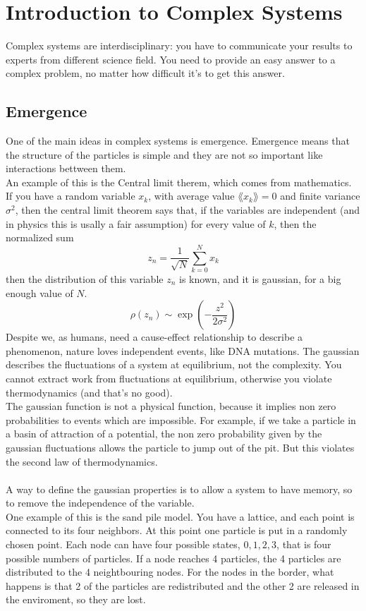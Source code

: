 \chapter{Introduction to Complex Systems}
Complex systems are interdisciplinary: you have to communicate your results to experts from different science field.
You need to provide an easy answer to a complex problem, no matter how difficult it's to get this answer.

\section{Emergence}
One of the main ideas in complex systems is emergence. Emergence means that the structure of the particles is simple and they are not so important like interactions bettween them. \\
An example of this is the Central limit therem, which comes from mathematics. \\
If you have a random variable $x_k$, with average value $\lang x_k \rang = 0$ and finite variance $\sigma^2$, then the central limit theorem says that, if the variables are independent (and in physics this is usally a fair assumption) for every value of $k$, then the normalized sum 
$$
	z_n = \frac{1}{\sqrt{N}}\sum_{k=0}^N x_k
$$
then the distribution of this variable $z_n$ is known, and it is gaussian, for a big enough value of $N$.
$$
	\rho(z_n) \sim \exp\left(-\frac{z^2}{2\sigma^2}\right)
$$
Despite we, as humans, need a cause-effect relationship to describe a phenomenon, nature loves independent events, like DNA mutations.
The gaussian describes the fluctuations of a system at equilibrium, not the complexity. You cannot extract work from fluctuations at equilibrium, otherwise you violate thermodynamics (and that's no good). \\
The gaussian function is not a physical function, because it implies non zero probabilities to events which are impossible. For example, if we take a particle in a basin of attraction of a potential, the non zero probability given by the gaussian fluctuations allows the particle to jump out of the pit. But this violates the second law of thermodynamics. \\ \\
A way to define the gaussian properties is to allow a system to have memory, so to remove the independence of the variable. \\
One example of this is the sand pile model. You have a lattice, and each point is connected to its four neighbors. At this point one particle is put in a randomly chosen point. Each node can have four possible states, $0,1,2,3$, that is four possible numbers of particles. If a node reaches 4 particles, the 4 particles are distributed to the 4 neightbouring nodes. For the nodes in the border, what happens is that 2 of the particles are redistributed and the other 2 are released in the enviroment, so they are lost. \\
